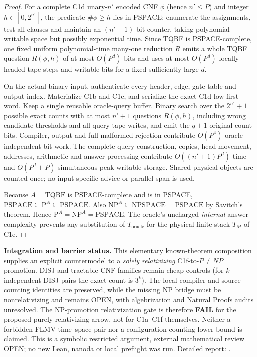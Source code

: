 \documentclass[11pt]{article}
\begin{document}
\begin{proof}
For a complete C1d unary-$n'$ encoded CNF $\phi$ (hence $n'\le P$) and
integer $h\in[0,2^{n'}]$, the predicate $\#\phi\ge h$ lies in
$\mathrm{PSPACE}$: enumerate the assignments, test all clauses
and maintain an $(n'+1)$-bit counter, taking polynomial writable
space but possibly exponential time. Since TQBF is PSPACE-complete,
one fixed uniform polynomial-time many-one reduction $R$ emits
a whole TQBF question $R(\phi,h)$ of at most $O(P^d)$ bits and
uses at most $O(P^d)$ locally headed tape steps and writable bits
for a fixed sufficiently large $d$.

On the actual binary input, authenticate every header, edge,
gate table and output index. Materialize C1b and C1c, and serialize
the exact C1d low-first word. Keep a single reusable oracle-query
buffer. Binary search over the $2^{n'}+1$ possible exact counts
with at most $n'+1$ questions $R(\phi,h)$, including wrong
candidate thresholds and all query-tape writes, and emit the
$q+1$ original-count bits. Compiler, output and full malformed
rejection contribute $O(P^4)$ oracle-independent bit work.
The complete query construction, copies, head movement,
addresses, arithmetic and answer processing contribute
$O((n'+1)P^d)$ time and $O(P^d+P)$ simultaneous peak
writable storage. Shared physical objects are counted once;
no input-specific advice or parallel span is used.

Because $A=\mathrm{TQBF}$ is PSPACE-complete and is in PSPACE,
$\mathrm{PSPACE}\subseteq\mathrm{P}^A\subseteq\mathrm{PSPACE}$.
Also $\mathrm{NP}^A\subseteq\mathrm{NPSPACE}
=\mathrm{PSPACE}$ by Savitch's theorem. Hence
$\mathrm{P}^A=\mathrm{NP}^A=\mathrm{PSPACE}$.
The oracle's uncharged \emph{internal} answer complexity
prevents any substitution of $T_{\mathrm{oracle}}$ for
the physical finite-stack $T_M$ of C1e.
\end{proof}
\noindent\textbf{Integration and barrier status.}
This elementary known-theorem composition supplies an explicit
countermodel to a \emph{solely relativizing}
C1f-to-$P\ne NP$ promotion. DISJ and tractable CNF families
remain cheap controls (for $k$ independent DISJ pairs the exact
count is $3^k$). The local compiler and source-counting
identities are preserved, while the missing NP bridge must be
nonrelativizing and remains OPEN, with algebrization and
Natural Proofs audits unresolved. The NP-promotion
relativization gate is therefore \textbf{FAIL} for the proposed
purely relativizing arrow, not for C1a--C1f themselves.
Neither a forbidden FLMV time--space pair nor a
configuration-counting lower bound is claimed.
This is a symbolic restricted argument, external mathematical
review OPEN; no new Lean, nanoda or local preflight was run.
Detailed report:
.
\end{document}

